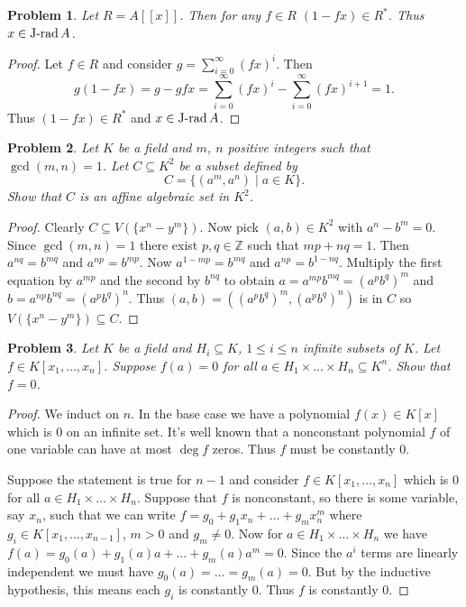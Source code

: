 \documentclass{article}
\newcommand{\J}{\textup{J-rad}\,}
\newtheorem{problem}{Problem}
\begin{document}
\begin{problem}
Let $R = A[[x]]$. Then for any $f \in R$ $(1-fx) \in R^*$. Thus $x \in \J A$.
\end{problem}
\begin{proof}
Let $f \in R$ and consider $g = \sum_{i=0}^{\infty} (fx)^i$. Then
\[
g (1 - fx) = g - gfx = \sum_{i=0}^{\infty} (fx)^i - \sum_{i=0}^{\infty} (fx)^{i+1} = 1.
\]
Thus $(1 - fx) \in R^*$ and $x \in \J A$.
\end{proof}

\begin{problem}
Let $K$ be a field and $m$, $n$ positive integers such that $\gcd (m,n) = 1$. Let $C \subseteq K^2$ be a subset defined by
\[
C = \{(a^m, a^n) \mid a \in K\}.
\]
Show that $C$ is an affine algebraic set in $K^2$.
\end{problem}
\begin{proof}
Clearly $C \subseteq V(\{x^n - y^m\})$. Now pick $(a,b) \in K^2$ with $a^n - b^m = 0$. Since $\gcd (m,n) = 1$ there exist $p,q \in \mathbb{Z}$ such that $mp + nq = 1$. Then $a^{nq} = b^{mq}$ and $a^{np} = b^{mp}$. Now $a^{1 - mp} = b^{mq}$ and $a^{np} = b^{1 - nq}$. Multiply the first equation by $a^{mp}$ and the second by $b^{nq}$ to obtain $a = a^{mp}b^{mq} = (a^pb^q)^m$ and $b = a^{np}b^{nq} = (a^pb^q)^n$. Thus $(a,b) = ((a^pb^q)^m, (a^pb^q)^n)$ is in $C$ so $V(\{x^n - y^m\}) \subseteq C$.
\end{proof}

\begin{problem}
\label{infinite}
Let $K$ be a field and $H_i \subseteq K$, $1 \leq i \leq n$ infinite subsets of $K$. Let $f \in K[x_1, \dots , x_n]$. Suppose $f(a) = 0$ for all $a \in H_1 \times \dots \times H_n \subseteq K^n$. Show that $f = 0$.
\end{problem}
\begin{proof}
We induct on $n$. In the base case we have a polynomial $f(x) \in K[x]$ which is $0$ on an infinite set. It's well known that a nonconstant polynomial $f$ of one variable can have at most $\deg f$ zeros. Thus $f$ must be constantly $0$.

Suppose the statement is true for $n-1$ and consider $f \in K[x_1, \dots , x_n]$ which is $0$ for all $a \in H_1 \times \dots \times H_n$. Suppose that $f$ is nonconstant, so there is some variable, say $x_n$, such that we can write $f = g_0 + g_1x_n + \dots + g_mx_n^m$ where $g_i \in K[x_1, \dots , x_{n-1}]$, $m > 0$ and $g_m \neq 0$. Now for $a \in H_1 \times \dots \times H_n$ we have $f(a) = g_0(a) + g_1(a) a + \dots + g_m(a) a^m = 0$. Since the $a^i$ terms are linearly independent we must have $g_0(a) = \dots = g_m(a) = 0$. But by the inductive hypothesis, this means each $g_i$ is constantly $0$. Thus $f$ is constantly $0$.
\end{proof}
\end{document}

